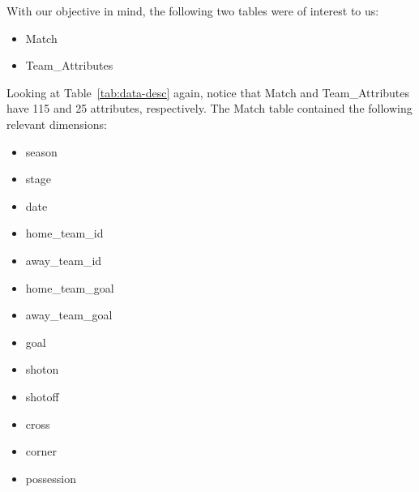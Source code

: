 \documentclass[11pt]{article}
\begin{document}
With our objective in mind, the following two tables were of interest to us:
\begin{itemize}
  \item Match
  \item Team\_Attributes
\end{itemize}

Looking at Table~\ref{tab:data-desc} again, notice that Match and Team\_Attributes have 115 and 25 attributes, respectively.
The Match table contained the following relevant dimensions:
\begin{itemize}
  \item season
  \item stage
  \item date
  \item home_team_id
  \item away_team_id
  \item home_team_goal
  \item away_team_goal
  \item goal
  \item shoton
  \item shotoff
  \item cross
  \item corner
  \item possession
\end{itemize}




\end{document}
